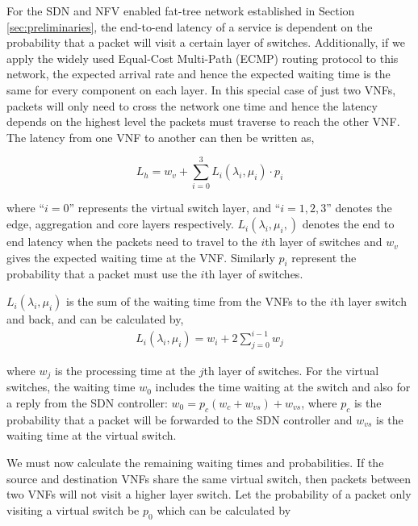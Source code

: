 For the SDN and NFV enabled fat-tree network established in Section \ref{sec:preliminaries}, the end-to-end latency of a service is dependent on the probability that a packet will visit a certain layer of switches. Additionally, if we apply the widely used Equal-Cost Multi-Path (ECMP) \cite{ChiesaKS17} routing protocol to this network, the expected arrival rate and hence the expected waiting time is the same for every component on each layer. In this special case of just two VNFs, packets will only need to cross the network one time and hence the latency depends on the highest level the packets must traverse to reach the other VNF. The latency from one VNF to another can then be written as,

\begin{equation}
    \label{eq:mean_latency}
    L_h = w_v + \sum_{i=0}^3 L_i(\lambda_i, \mu_i) \cdot p_i
\end{equation}

\noindent where ``$i=0$'' represents the virtual switch layer, and ``$i=1,2,3$'' denotes the edge, aggregation and core layers respectively. $L_i(\lambda_i, \mu_i,)$ denotes the end to end latency when the packets need to travel to the $i$th layer of switches and $w_v$ gives the expected waiting time at the VNF. Similarly $p_i$ represent the probability that a packet must use the $i$th layer of switches.

$L_i(\lambda_i, \mu_i)$ is the sum of the waiting time from the VNFs to the $i$th layer switch and back, and can be calculated by,
\begin{equation}
    \label{eq:latency_path}
    \begin{split}
        L_i(\lambda_i, \mu_i) = w_i + 2 \sum_{j=0}^{i-1} w_j
    \end{split}
\end{equation}

\noindent where $w_j$ is the processing time at the $j$th layer of switches. For the virtual switches, the waiting time $w_0$ includes the time waiting at the switch and also for a reply from the SDN controller: $w_0 = p_c (w_c + w_{vs}) + w_{vs}$, where $p_c$ is the probability that a packet will be forwarded to the SDN controller and $w_{vs}$ is the waiting time at the virtual switch.

We must now calculate the remaining waiting times and probabilities. If the source and destination VNFs share the same virtual switch, then packets between two VNFs will not visit a higher layer switch. Let the probability of a packet only visiting a virtual switch be $p_0$ which can be calculated by

